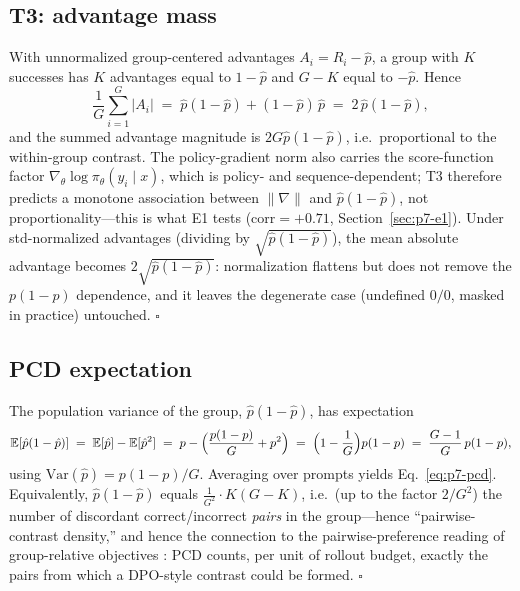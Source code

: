 \documentclass{article}
\newcommand{\E}{\mathbb{E}}
\begin{document}
\subsection{T3: advantage mass}
\label{sec:p7-appendix-t3}
With unnormalized group-centered advantages $A_i = R_i - \hat p$, a group
with $K$ successes has $K$ advantages equal to $1 - \hat p$ and $G - K$
equal to $-\hat p$. Hence
\begin{equation}
  \frac{1}{G} \sum_{i=1}^{G} |A_i|
  \;=\; \hat p (1 - \hat p) + (1 - \hat p)\, \hat p
  \;=\; 2\, \hat p (1 - \hat p),
\end{equation}
and the summed advantage magnitude is $2 G \hat p(1-\hat p)$, i.e.\
proportional to the within-group contrast. The policy-gradient norm also
carries the score-function factor
$\nabla_\theta \log \pi_\theta(y_i \mid x)$, which is policy- and
sequence-dependent; T3 therefore predicts a monotone association between
$\|\nabla\|$ and $\hat p(1-\hat p)$, not proportionality---this is what E1
tests ($\mathrm{corr} = +0.71$, Section~\ref{sec:p7-e1}). Under
std-normalized advantages (dividing by
$\sqrt{\hat p(1-\hat p)}$), the mean absolute advantage becomes
$2\sqrt{\hat p(1-\hat p)}$: normalization flattens but does not remove the
$p(1-p)$ dependence, and it leaves the degenerate case (undefined $0/0$,
masked in practice) untouched. \hfill$\square$

\subsection{PCD expectation}
\label{sec:p7-appendix-pcd}
The population variance of the group, $\hat p(1-\hat p)$, has expectation
\begin{equation}
  \E[\hat p(1-\hat p)]
  \;=\; \E[\hat p] - \E[\hat p^2]
  \;=\; p - \Bigl(\frac{p(1-p)}{G} + p^2\Bigr)
  \;=\; \Bigl(1 - \frac{1}{G}\Bigr) p (1-p)
  \;=\; \frac{G-1}{G}\, p(1-p),
\end{equation}
using $\mathrm{Var}(\hat p) = p(1-p)/G$. Averaging over prompts yields
Eq.~\eqref{eq:p7-pcd}. Equivalently, $\hat p(1-\hat p)$ equals
$\frac{1}{G^2} \cdot K(G-K)$, i.e.\ (up to the factor $2/G^2$) the number of
discordant correct/incorrect \emph{pairs} in the group---hence
``pairwise-contrast density,'' and hence the connection to the
pairwise-preference reading of group-relative objectives
\citep{wu2025grpo_dpo, rafailov2024direct}: PCD counts, per unit of rollout
budget, exactly the pairs from which a DPO-style contrast could be formed.
\hfill$\square$
\end{document}
